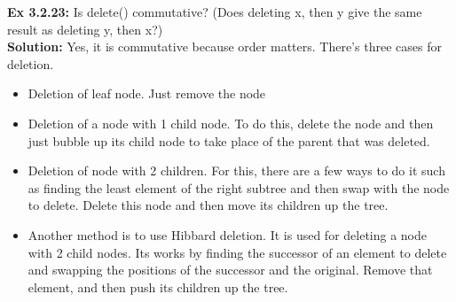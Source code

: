 \documentclass[11pt,fleqn]{article}
\begin{document}
\textbf{Ex 3.2.23:} Is delete() commutative? (Does deleting x, then y give the same result as deleting
y, then x?)\\
	
\textbf{Solution:}
Yes, it is commutative because order matters. There's three cases for deletion.

\begin{itemize}
	\item Deletion of leaf node. Just remove the node
	\item Deletion of a node with 1 child node. To do this, delete the node and then just bubble up its child node to take place of the parent that was deleted.
	\item Deletion of node with 2 children. For this, there are a few ways to do it such as finding the least element of the right subtree and then swap with the node to delete. Delete this node and then move its children up the tree.
	
	\item Another method is to use Hibbard deletion. It is used for deleting a node with 2 child nodes. Its works by finding the successor of an element to delete and swapping the positions of the successor and the original. Remove that element, and then push its children up the tree.
\end{itemize}
\end{document}
